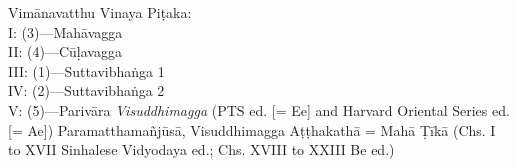 \begin{thebibliography}{xxxxxxxxxxx}
 Vimānavatthu
 Vinaya Piṭaka:\\ I: (3)—Mahāvagga \\ II: (4)—Cūḷavagga \\ III: (1)—Suttavibhaṅga 1 \\ IV: (2)—Suttavibhaṅga 2 \\ V: (5)—Parivāra
 \emph{Visuddhimagga} (PTS ed. [= Ee] and Harvard Oriental Series ed. [= Ae])
 Paramatthamañjūsā, Visuddhimagga Aṭṭhakathā = Mahā Ṭīkā (Chs. I to XVII Sinhalese Vidyodaya ed.; Chs. XVIII to XXIII Be ed.)
\end{thebibliography}
